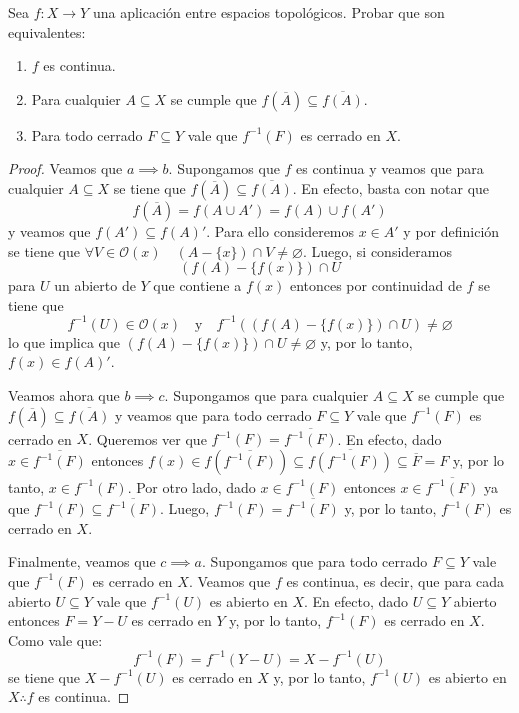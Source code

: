 \documentclass{article}
\theoremstyle{definition}
\newcommand{\cl}[1]{\overline{#1}}              %
\newenvironment{ejercicio}[1]{\begin{trivlist}
\item[\hskip \labelsep {\bfseries Ejercicio}\hskip \labelsep {\bfseries #1.}]}{\end{trivlist}}
\begin{document}
\begin{ejercicio}{12}
    Sea \(f:X\rightarrow Y\) una aplicación entre espacios topológicos. Probar que son equivalentes:
    \begin{enumerate}
        \item \(f\) es continua.
        \item Para cualquier \(A\subseteq X\) se cumple que \(f(\cl{A})\subseteq\overline{f(A)}\).
        \item Para todo cerrado \(F\subseteq Y\) vale que \(f^{-1}(F)\) es cerrado en \(X\).
    \end{enumerate}
\end{ejercicio}
\begin{proof}
    Veamos que \( a \implies b \). Supongamos que \( f \) es continua y veamos que para cualquier \( A \subseteq X \)
    se tiene que \( f(\cl{A}) \subseteq \overline{f(A)} \). En efecto, basta con notar que \[
        f(\cl{A}) = f(A \cup A') = f(A) \cup f(A')
    \]
    y veamos que \( f(A') \subseteq f(A)' \). Para ello consideremos \( x \in A' \) y por definición se tiene que
    \( \forall V \in \mathcal{O}(x) \quad (A - \{ x \}) \cap V \neq \varnothing \). Luego, si consideramos \[
        (f(A) - \{ f(x) \}) \cap U
    \]
    para \( U \) un abierto de \( Y \) que contiene a \( f(x) \) entonces por continuidad de \( f \) se tiene que \[
        f^{-1}(U) \in \mathcal{O}(x) \quad \text{y} \quad f^{-1}((f(A) - \{ f(x) \}) \cap U) \neq \varnothing
    \]
    lo que implica que \( (f(A) - \{ f(x) \}) \cap U \neq \varnothing \) y, por lo tanto, \( f(x) \in f(A)' \).

    Veamos ahora que \( b \implies c \). Supongamos que para cualquier \( A \subseteq X \) se cumple que
    \( f(\cl{A}) \subseteq \overline{f(A)} \) y veamos que para todo cerrado \( F \subseteq Y \) vale que
    \( f^{-1}(F) \) es cerrado en \( X \). Queremos ver que \( f^{-1}(F) = \overline{f^{-1}(F)} \). En efecto,
    dado \( x \in \overline{f^{-1}(F)} \) entonces \( f(x) \in f(\overline{f^{-1}(F)}) \subseteq \overline{f(f^{-1}(F))} \subseteq \overline{F} = F \)
    y, por lo tanto, \( x \in f^{-1}(F) \). Por otro lado, dado \( x \in f^{-1}(F) \) entonces \( x \in \overline{f^{-1}(F)} \) ya que
    \( f^{-1}(F) \subseteq \overline{f^{-1}(F)} \). Luego, \( f^{-1}(F) = \overline{f^{-1}(F)} \) y, por lo tanto, \( f^{-1}(F) \) es cerrado en \( X \).

    Finalmente, veamos que \( c \implies a \). Supongamos que para todo cerrado \( F \subseteq Y \) vale que \( f^{-1}(F) \) es cerrado en \( X \).
    Veamos que \( f \) es continua, es decir, que para cada abierto \( U \subseteq Y \) vale que \( f^{-1}(U) \) es abierto en \( X \).
    En efecto, dado \( U \subseteq Y \) abierto entonces \( F = Y - U \) es cerrado en \( Y \) y, por lo tanto, \( f^{-1}(F) \) es cerrado en \( X \).
    Como vale que: \[
        f^{-1}(F) = f^{-1}(Y - U) = X - f^{-1}(U)
    \]
    se tiene que \( X - f^{-1}(U) \) es cerrado en \( X \) y, por lo tanto, \( f^{-1}(U) \) es abierto en \( X \therefore f \) es continua.
\end{proof}
\end{document}
